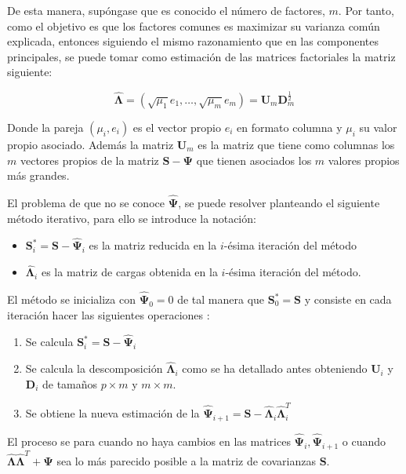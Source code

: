 \noindent De esta manera, supóngase que es conocido el número de factores, $m$. Por tanto, como el objetivo es que los factores comunes es maximizar su varianza común explicada, entonces siguiendo el mismo razonamiento que en las componentes principales, se puede tomar como estimación de las matrices factoriales la matriz siguiente:

\begin{equation}
\mathbf{\hat{\Lambda}}=(\sqrt{\mu_1}e_1,\ldots,\sqrt{\mu_m}e_m)=\mathbf{U}_m\mathbf{D}_m^{\frac{1}{2}}
\end{equation}

\noindent Donde la pareja $(\mu_i, e_i)$ es el vector propio $e_i$ en formato columna y $\mu_i$ su valor propio asociado. Además la matriz $\mathbf{U}_m$ es la matriz que tiene como columnas los $m$ vectores propios de la matriz $\mathbf{S}-\mathbf{\Psi}$ que tienen asociados los $m$ valores propios más grandes. 

\noindent El problema de que no se conoce $\mathbf{\hat{\Psi}}$, se puede resolver planteando el siguiente método iterativo, para ello se introduce la notación:
\begin{itemize}
\item $\mathbf{S}_i^*=\mathbf{S}-\hat{\mathbf{\Psi}}_i$ es la matriz reducida en la $i$-ésima iteración del método
\item $\mathbf{\hat{\Lambda}}_i$ es la matriz de cargas obtenida en la $i$-ésima iteración del método. 
\end{itemize}
\noindent El método se inicializa con $\mathbf{\hat{\Psi}}_0=0$ de tal manera que $\mathbf{S}_0^*=\mathbf{S}$ y consiste en cada iteración hacer las siguientes operaciones \cite{Johnson 2007, Peña 2002, Cuadras 2014}: 
\begin{enumerate}
\item Se calcula $\mathbf{S}_i^*=\mathbf{S-\hat{\Psi}}_i$
\item Se calcula la descomposición $\mathbf{\hat{\Lambda}}_i$ como se ha detallado antes obteniendo $\mathbf{U}_i$ y $\mathbf{D}_i$ de tamaños $p\times m $ y $m\times m$. 
\item Se obtiene la nueva estimación de la $\mathbf{\hat{\Psi}}_{i+1}=\mathbf{S}-\mathbf{\hat{\Lambda}}_i\mathbf{\hat{\Lambda}}_i^T$
\end{enumerate}

\noindent El proceso se para cuando no haya cambios en las matrices $\mathbf{\hat{\Psi}}_i,\mathbf{\hat{\Psi}}_{i+1}$ o cuando $\mathbf{\hat{\Lambda}}\mathbf{\hat{\Lambda}}^T+\mathbf{\Psi}$ sea lo más parecido posible a la matriz de covarianzas $\mathbf{S}$.

